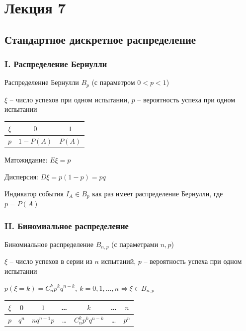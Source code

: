 \documentclass[12pt]{article}
\begin{document}
    \section{Лекция 7}

    \subsection{Стандартное дискретное распределение}

    \subsubsection{I. Распределение Бернулли}

    \hypertarget{bernoullidistribution}{}

    Распределение Бернулли $B_p$ (с параметром $0 < p < 1$)

    $\xi$ -- число успехов при одном испытании, $p$ -- вероятность успеха при одном испытании
    
    \smallvspace

    \begin{tabular}{c|c|c}
        $\xi$ & $0$        & $1$    \\
        \hline
        $p$   & $1 - P(A)$ & $P(A)$
    \end{tabular}

    \smallvspace

    Матожидание: $E\xi = p$

    Дисперсия: $D\xi = p(1 - p) = pq$

    \Ex Индикатор события $I_A \in B_p$ как раз имеет распределение Бернулли, где $p = P(A)$

    \subsubsection{II. Биномиальное распределение}

    \hypertarget{binomialdistributionproperties}{}

    Биномиальное распределение $B_{n,p}$ (с параметрами $n, p$)

    $\xi$ -- число успехов в серии из $n$ испытаний, $p$ -- вероятность успеха при одном испытании

    $p(\xi = k) = C^k_n p^k q^{n - k}, \ k = 0, 1, \dots, n \Longleftrightarrow \xi \in B_{n,p}$

    \smallvspace

    \begin{tabular}{c|c|c|c|c|c|c}
        $\xi$ & $0$        & $1$ & \dots & $k$ & \dots & $n$    \\
        \hline
        $p$   & $q^n$ & $n q^{n - 1} p$ & \dots & $C^k_n p^k q^{n - k}$ & \dots & $p^n$
    \end{tabular}
\end{document}
